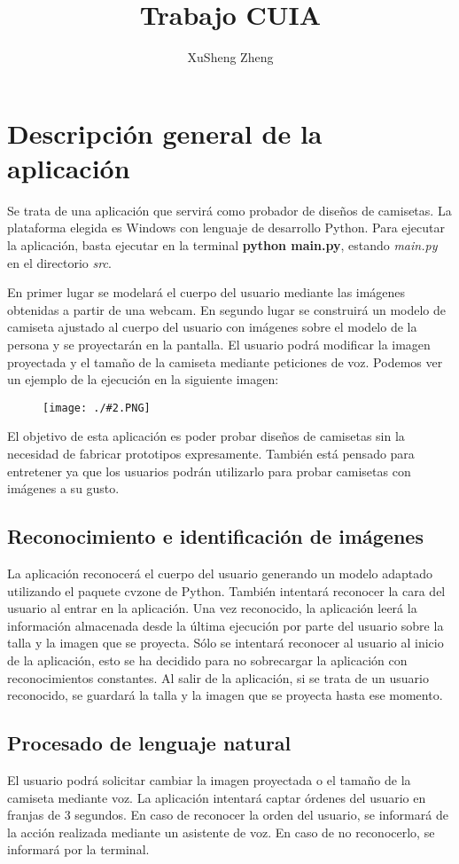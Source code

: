 \documentclass[twoside]{article}
\title{Trabajo CUIA}
\author{XuSheng Zheng}
\date{}
\newcommand{\image}[2]{
\begin{figure}[H]
    \texttt{[image: ./\#2.PNG]}
    \centering
\end{figure}
}
\begin{document}
\maketitle
\section{Descripción general de la aplicación}
Se trata de una aplicación que servirá como probador de diseños de camisetas. La plataforma elegida es Windows con lenguaje de desarrollo Python. Para ejecutar la aplicación, basta ejecutar en la terminal \textbf{python main.py}, estando \textit{main.py} en el directorio \textit{src}.

En primer lugar se modelará el cuerpo del usuario mediante las imágenes obtenidas a partir de una webcam. En segundo lugar se construirá un modelo de camiseta ajustado al cuerpo del usuario con imágenes sobre el modelo de la persona y se proyectarán en la pantalla. El usuario podrá modificar la imagen proyectada y el tamaño de la camiseta mediante peticiones de voz. Podemos ver un ejemplo de la ejecución en la siguiente imagen:
\image{10}{Captura}

El objetivo de esta aplicación es poder probar diseños de camisetas sin la necesidad de fabricar prototipos expresamente. También está pensado para entretener ya que los usuarios podrán utilizarlo para probar camisetas con imágenes a su gusto.

\subsection{Reconocimiento e identificación de imágenes}
La aplicación reconocerá el cuerpo del usuario generando un modelo adaptado utilizando el paquete cvzone de Python. También intentará reconocer la cara del usuario al entrar en la aplicación. Una vez reconocido, la aplicación leerá la información almacenada desde la última ejecución por parte del usuario sobre la talla y la imagen que se proyecta. Sólo se intentará reconocer al usuario al inicio de la aplicación, esto se ha decidido para no sobrecargar la aplicación con reconocimientos constantes. Al salir de la aplicación, si se trata de un usuario reconocido, se guardará la talla y la imagen que se proyecta hasta ese momento.
\subsection{Procesado de lenguaje natural}
El usuario podrá solicitar cambiar la imagen proyectada o el tamaño de la camiseta mediante voz. La aplicación intentará captar órdenes del usuario en franjas de 3 segundos. En caso de reconocer la orden del usuario, se informará de la acción realizada mediante un asistente de voz. En caso de no reconocerlo, se informará por la terminal. 
\end{document}
